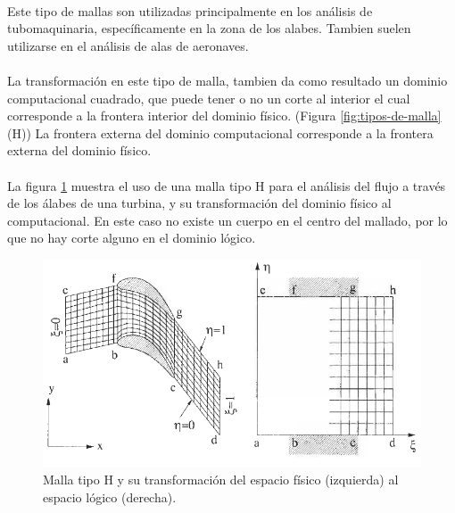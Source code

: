 \documentclass[letterpaper, openright, 12pt]{book}
\begin{document}
			\paragraph*{}
				Este tipo de mallas son utilizadas principalmente en los análisis de tubomaquinaria, específicamente en la zona de los alabes.\cite{blazek}\cite{best-practices-grid-generation} Tambien suelen utilizarse en el análisis de alas de aeronaves. \cite{vladimir-grid}
			\paragraph*{}
				La transformación en este tipo de malla, tambien da como resultado un dominio computacional cuadrado, que puede tener o no un corte al interior el cual corresponde a la frontera interior del dominio físico. (Figura \ref*{fig:tipos-de-malla}(H)) La frontera externa del dominio computacional corresponde a la frontera externa del dominio físico.
			
			\paragraph*{} 
			La figura \ref{fig:malla-h} muestra el uso de una malla tipo H para el análisis del flujo a través de los álabes de una turbina, y su transformación del dominio físico al computacional. En este caso no existe un cuerpo en el centro del mallado, por lo que no hay corte alguno en el dominio lógico.
			\begin{figure}[htbp!]
				\centering
				\includegraphics[width=170mm]{./Imagenes/malla-h}
				\captionsetup{justification=centering, margin=2cm}
				\caption[Malla tipo O]{Malla tipo H y su transformación del espacio físico (izquierda) al espacio lógico (derecha). \cite{blazek}}
				\label{fig:malla-h}
			\end{figure}
			
\end{document}
